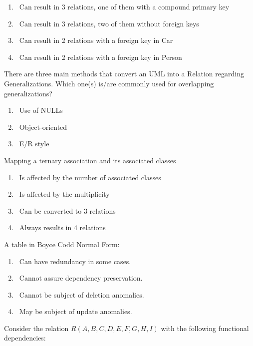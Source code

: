 \documentclass{bdad}
\begin{document}
\begin{enumerate}
    \item \checkbox~Can result in 3 relations, one of them with a compound primary key
    \item \checkbox~Can result in 3 relations, two of them without foreign keys
    \item \checkbox~Can result in 2 relations with a foreign key in Car
    \item \checkbox~Can result in 2 relations with a foreign key in Person
\end{enumerate}

There are three main methods that convert an UML into a Relation regarding Generalizations. Which one(s) is/are commonly used for overlapping generalizations?

\begin{enumerate}
    \item \checkbox~Use of NULLs
    \item \checkbox~Object-oriented
    \item \checkbox~E/R style
\end{enumerate}

Mapping a ternary association and its associated classes

\begin{enumerate}
    \item \checkbox~Is affected by the number of associated classes
    \item \checkbox~Is affected by the multiplicity
    \item \checkbox~Can be converted to 3 relations
    \item \checkbox~Always results in 4 relations
\end{enumerate}

A table in Boyce Codd Normal Form:

\begin{enumerate}
    \item \checkbox~Can have redundancy in some cases.
    \item \checkbox~Cannot assure dependency preservation.
    \item \checkbox~Cannot be subject of deletion anomalies.
    \item \checkbox~May be subject of update anomalies.
\end{enumerate}

Consider the relation $R (A, B, C, D, E, F, G, H, I)$ with the following functional dependencies:
\end{document}
